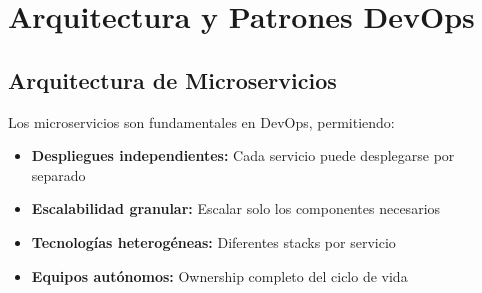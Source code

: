 \documentclass[12pt,a4paper]{article}
\begin{document}
\section{Arquitectura y Patrones DevOps}

\subsection{Arquitectura de Microservicios}
Los microservicios son fundamentales en DevOps, permitiendo:
\begin{itemize}
    \item \textbf{Despliegues independientes:} Cada servicio puede desplegarse por separado
    \item \textbf{Escalabilidad granular:} Escalar solo los componentes necesarios
    \item \textbf{Tecnologías heterogéneas:} Diferentes stacks por servicio
    \item \textbf{Equipos autónomos:} Ownership completo del ciclo de vida
\end{itemize}

\newpage
\end{document}
